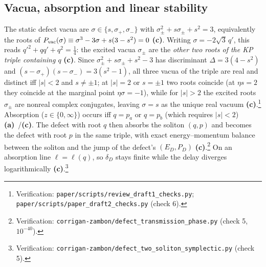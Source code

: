 \documentclass[11pt,a4paper]{article}
\newcommand{\lab}[1]{{\normalfont\sffamily\footnotesize\bfseries(#1)}}
\newcommand{\La}{\lab{a}}
\newcommand{\Lc}{\lab{c}}
\newcommand{\scr}[1]{\nolinkurl{#1}}
\newcommand{\chk}[1]{\footnote{\raggedright Verification: #1.}}
\theoremstyle{remark}
\begin{document}
\subsection{Vacua, absorption and linear stability}

The static defect vacua are $\sigma\in\{s,\sigma_+,\sigma_-\}$ with $\sigma_\pm^2+s\sigma_\pm+s^2=3$, equivalently the roots of $P_{\rm vac}(\sigma)\equiv\sigma^3-3\sigma+s(3-s^2)=0$ \Lc. Writing $\sigma=-2\sqrt3\,q'$, this reads $q'^2+qq'+q^2=\tfrac14$: the excited vacua $\sigma_\pm$ are the \emph{other two roots of the KP triple containing $q$} \Lc. Since $\sigma_\pm^2+s\sigma_\pm+s^2-3$ has discriminant $\Delta=3(4-s^2)$ and $(s-\sigma_+)(s-\sigma_-)=3(s^2-1)$, all three vacua of the triple are real and distinct iff $|s|<2$ and $s\neq\pm1$; at $|s|=2$ or $s=\pm1$ two roots coincide (at $\eta s=2$ they coincide at the marginal point $\eta\sigma=-1$), while for $|s|>2$ the excited roots $\sigma_\pm$ are nonreal complex conjugates, leaving $\sigma=s$ as the unique real vacuum \Lc.\chk{\scr{paper/scripts/review_draft1_checks.py}; \scr{paper/scripts/paper_draft2_checks.py} (check 6)} Absorption ($z\in\{0,\infty\}$) occurs iff $q=p_a$ or $q=p_b$ (which requires $|s|<2$) \La~\cite{CZ}/\Lc. The defect with root $q$ then absorbs the soliton $(q,p)$ and becomes the defect with root $p$ in the same triple, with exact energy--momentum balance between the soliton and the jump of the defect's $(E_D,P_D)$ \Lc.\chk{\scr{corrigan-zambon/defect_transmission_phase.py} (check 5, $10^{-40}$)} On an absorption line $\ell=\ell(q)$, so $\delta_D$ stays finite while the delay diverges logarithmically \Lc.\chk{\scr{corrigan-zambon/defect_two_soliton_symplectic.py} (check 5)}
\end{document}
